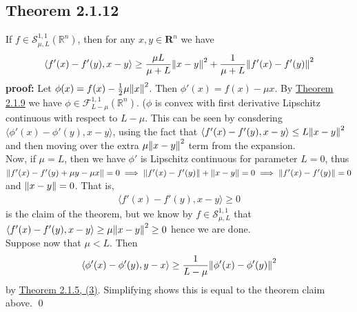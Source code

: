 \documentclass[12pt,a4paper]{article}
\begin{document}
	 \subsection*{Theorem 2.1.12}\label{thm2112}
	 If $f \in \mathcal{S}_{\mu, L}^{1,1}(\mathbb{R}^n)$, then for any $x, y \in \mathbf{R}^n$ we have
	 \begin{align*}
	 	\langle f'(x) - f'(y), x - y \rangle \geq \frac{\mu L}{\mu + L}\norm{x - y}^2  + \frac{1}{\mu + L}\norm{f'(x) - f'(y)}^2
	 \end{align*}
	 \textbf{proof:} Let $\phi(x) = f(x) - \frac{1}{2}\mu \norm{x}^2$. Then $\phi'(x) = f(x) - \mu x$. By \hyperref[thm219]{Theorem 2.1.9} we have $\phi \in \mathcal{F}_{L - \mu}^{1,1}(\mathbb{R}^n)$. ($\phi$ is convex with first derivative Lipschitz continuous with respect to $L - \mu$. This can be seen by consdering $\langle \phi'(x) - \phi'(y), x - y \rangle$, using the fact that $\langle f'(x) - f'(y), x - y \rangle \leq L \norm{x - y}^2$ and then moving over the extra $\mu \norm{x - y}^2$ term from the expansion. \\
	 Now, if $\mu = L$, then we have $\phi'$ is Lipschitz continuous for parameter $L=0$, thus $\norm{f'(x) - f'(y) + \mu y - \mu x} = 0 \implies \norm{f'(x) - f'(y)} + \norm{x - y} = 0 \implies \norm{f'(x) - f'(y)} = 0$ and $\norm{x - y} = 0$. That is, 
	 \begin{align*}
	 	\langle f'(x) - f'(y), x - y \rangle \geq 0
	 \end{align*}
	is the claim of the theorem, but we know by $f \in \mathcal{S}_{\mu, L}^{1,1}$ that $\langle f'(x) - f'(y), x - y \rangle \geq \mu \norm{x - y}^2 \geq 0$ hence we are done.\\
	Suppose now that $\mu < L$. Then
	\begin{align*}
		\langle \phi'(x) - \phi'(y), y - x \rangle \geq \frac{1}{L - \mu}\norm{\phi'(x) - \phi'(y)}^2
	\end{align*}
	by \hyperref[thm215]{Theorem 2.1.5, (3)}. Simplifying shows this is equal to the theorem claim above. \qed 
	 
\end{document}
